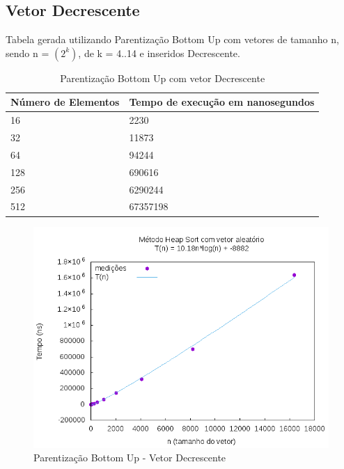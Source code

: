 \documentclass[12pt,a4paper,twoside]{report}
\begin{document}
\subsection{Vetor Decrescente}
Tabela gerada utilizando Parentização Bottom Up com vetores de tamanho n, sendo n = $(2^k)$, de k = 4..14 e inseridos Decrescente.
\begin{table}[H]
\centering
\caption{Parentização Bottom Up com vetor Decrescente}
\label{my-label}
\begin{tabular}{|l|l|}
\hline
\multicolumn{1}{|c|}{\textbf{Número de Elementos}} & \multicolumn{1}{c|}{\textbf{Tempo de execução em nanosegundos}} \\ \hline
16 & 2230 \\ \hline
32 & 11873 \\ \hline
64 & 94244 \\ \hline
128 & 690616 \\ \hline
256 & 6290244 \\ \hline
512 & 67357198 \\ \hline
\end{tabular}
\end{table}

\begin{figure}[H]
    \centering
    \includegraphics[width=0.7\linewidth]{graficos/HeapSort/vIntAleatorio/vIntAleatorio.png}
  \caption{Parentização Bottom Up - Vetor Decrescente}
\end{figure}
\end{document}
